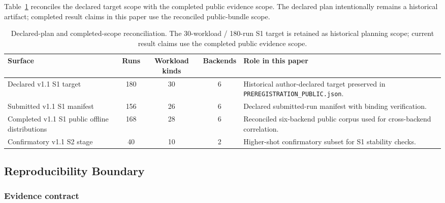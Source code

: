 \documentclass[aps,prxquantum,twocolumn,superscriptaddress,amsmath,amssymb,longbibliography,floatfix]{revtex4-2}
\begin{document}
Table~\ref{tab:scope_reconciliation} reconciles the declared target scope with the completed public evidence scope. The declared plan intentionally remains a historical artifact; completed result claims in this paper use the reconciled public-bundle scope.

\begin{table}[t]
\caption{Declared-plan and completed-scope reconciliation. The 30-workload / 180-run S1 target is retained as historical planning scope; current result claims use the completed public evidence scope.}
\label{tab:scope_reconciliation}
\begin{ruledtabular}
\begin{tabular}{lccc p{6.3cm}}
Surface & Runs & Workload kinds & Backends & Role in this paper \\
\hline
Declared v1.1 S1 target & 180 & 30 & 6 & Historical author-declared target preserved in \texttt{PREREGISTRATION\_PUBLIC.json}. \\
Submitted v1.1 S1 manifest & 156 & 26 & 6 & Declared submitted-run manifest with binding verification. \\
Completed v1.1 S1 public offline distributions & 168 & 28 & 6 & Reconciled six-backend public corpus used for cross-backend correlation. \\
Confirmatory v1.1 S2 stage & 40 & 10 & 2 & Higher-shot confirmatory subset for S1 stability checks. \\
\end{tabular}
\end{ruledtabular}
\end{table}

\subsection{Reproducibility Boundary}
\label{sec:reproducibility}

\subsubsection{Evidence contract}
\label{sec:evidence}
\end{document}
